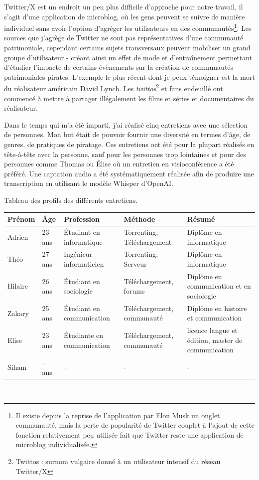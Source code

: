\begin{itemize}
    \subitem Twitter/X est un endroit un peu plus difficile d'approche pour notre travail, il s'agit d'une application de microblog, où les gens peuvent se suivre de manière individuel sans avoir l'option d’agréger les utilisateurs en des communautés\footnote{Il existe depuis la reprise de l'application par Elon Musk un onglet communauté, mais la perte de popularité de Twitter couplet à l'ajout de cette fonction relativement peu utilisée fait que Twitter reste une application de microblog individualisée. }. Les sources que j’agrège de Twitter ne sont pas représentatives d'une communauté patrimoniale, cependant certains sujets transversaux peuvent mobiliser un grand groupe d'utilisateur - créant ainsi un effet de mode et d’entraînement permettant d'étudier l'impacte de certains évènements sur la création de communautés patrimoniales pirates. L'exemple le plus récent dont je peux témoigner est la mort du réalisateur américain David Lynch. Les \textit{twittos}\footnote{Twittos : surnom vulgaire donné à un utilisateur intensif du réseau Twitter/X} et fans endeuillé ont commencé à mettre à partager illégalement les films et séries et documentaires du réalisateur. 
    
    \end{itemize}

Dans le temps qui m'a été imparti, j'ai réalisé cinq entretiens avec une sélection de personnes. Mon but était de pouvoir fournir une diversité en termes d'âge, de genres, de pratiques de piratage. Ces entretiens ont été pour la plupart réalisés en tête-à-tête avec la personne, sauf pour les personnes trop lointaines et pour des personnes comme Thomas ou Élise où un entretien en visioconférence a été préféré. Une captation audio a été systématiquement réalisée afin de produire une transcription en utilisant le modèle Whisper d'OpenAI.\newline

Tableau des profils des différents entretiens.\\
\begin{tabular}{|p{2cm}|p{2cm}|p{2cm}|p{2cm}|p{2cm}|}

\hline
   Prénom  & Âge & Profession & Méthode & Résumé\\
\hline
    Adrien & 23 ans & Étudiant en informatique & Torrenting, Téléchargement & Diplôme en informatique \\
\hline
    Théo & 27 ans & Ingénieur informaticien & Torrenting, Serveur & Diplôme en informatique\\
\hline
    Hilaire & 26 ans & Étudiant en sociologie & Téléchargement, forums & Diplôme en communication et en sociologie \\
\hline 
    Zakary & 25 ans & Étudiant en communication & Téléchargement, communauté & Diplôme en histoire et communication \\
\hline
    Elise & 23 ans & Étudiante en communication & Téléchargement, communauté & licence langue et édition, master de communication \\
\hline
    Siham & -- ans & -- & - & - \\
\hline
\end{tabular}\\

